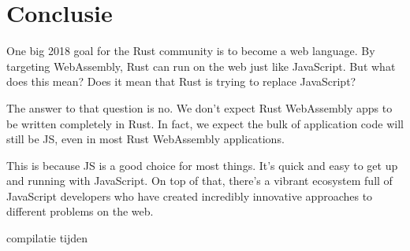 \chapter{Conclusie}

One big 2018 goal for the Rust community is to become a web language. By targeting WebAssembly, Rust
can run on the web just like JavaScript. But what does this mean? Does it mean that Rust is trying
to replace JavaScript?

The answer to that question is no. We don’t expect Rust WebAssembly apps to be written completely in
Rust. In fact, we expect the bulk of application code will still be JS, even in most Rust
WebAssembly applications.

This is because JS is a good choice for most things. It’s quick and easy to get up and running with
JavaScript. On top of that, there’s a vibrant ecosystem full of JavaScript developers who have
created incredibly innovative approaches to different problems on the web.

compilatie tijden
